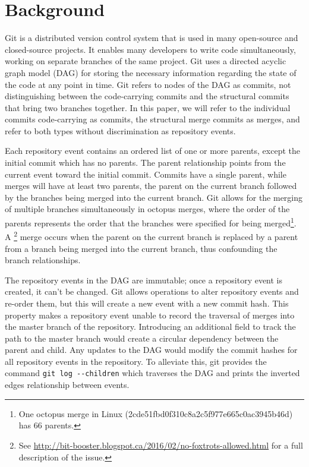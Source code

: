 
\section{Background}

Git is a distributed version control system that is used in many
open-source and closed-source projects. It enables many developers to
write code simultaneously, working on separate branches of the same
project. Git uses a directed acyclic graph model (DAG) for storing the
necessary information regarding the state of the code at any point in
time. Git refers to nodes of the DAG as commits, not distinguishing
between the code-carrying commits and the structural commits that bring
two branches together. In this paper, we will refer to the individual
commits code-carrying as commits, the structural merge commits as
merges, and refer to both types without discrimination as repository
events.

Each repository event contains an ordered list of one or more parents,
except the initial commit which has no parents. The parent relationship
points from the current event toward the initial commit.  Commits have a
single parent, while merges will have at least two parents, the parent
on the current branch followed by the branches being merged into the
current branch. Git allows for the merging of multiple branches
simultaneously in octopus merges, where the order of the parents
represents the order that the branches were specified for being merged\footnote{One octopus merge in Linux
  (2cde51fbd0f310c8a2c5f977e665c0ac3945b46d) has 66 parents.}.
A \foxtrot\footnote{See
  \url{http://bit-booster.blogspot.ca/2016/02/no-foxtrots-allowed.html}
  for a full description of the issue.} merge occurs when the parent on
the current branch is replaced by a parent from a branch being merged
into the current branch, thus confounding the branch relationships.

The repository events in the DAG are immutable; once a repository event
is created, it can't be changed.  Git allows operations to alter
repository events and re-order them, but this will create a new event
with a new commit hash. This property makes a repository event unable to
record the traversal of merges into the master branch of the repository.
Introducing an additional field to track the path to the master branch
would create a circular dependency between the parent and child. Any
updates to the DAG would modify the commit hashes for all repository
events in the repository. To alleviate this, git provides the command
\verb|git log --children| which traverses the DAG and prints the
inverted edges relationship between events.

